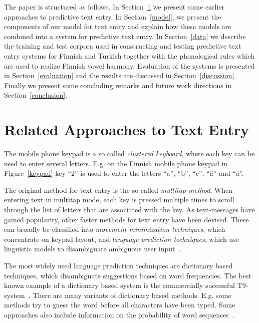 \documentclass{llncs}
\begin{document}
The paper is structured as follows. In Section~\ref{earlier-work} we
present some earlier approaches to predictive text entry. In
Section~\ref{model}, we present the components of our model for text
entry and explain how these models are combined into a system for
predictive text entry.  In Section~\ref{data} we describe the
training and test corpora used in constructing and testing predictive
text entry systems for Finnish and Turkish together with the
phonological rules which are used to realize Finnish vowel
harmony. Evaluation of the systems is presented in
Section~\ref{evaluation} and the results are discussed in
Section~\ref{discussion}. Finally we present some concluding remarks
and future work directions in Section~\ref{conclusion}.

\section{Related Approaches to Text Entry}\label{earlier-work}

The mobile phone keypad is a so called {\it clustered keyboard}, where each
key can be used to enter several letters. E.g. on the Finnish mobile
phone keypad in Figure~\ref{keypad} key ``2'' is used to enter the
letters ``a'', ``b'', ``c'', ``\"{a}'' and ``å''.

The original method for text entry is the so called
\textit{multitap-method}. When entering text in multitap mode, each key is
pressed multiple times to scroll through the list of letters that are
associated with the key. As text-messages have gained popularity, other
faster methods for text entry have been devised. These can broadly be
classified into {\it movement minimization techniques}, which concentrate on
keypad layout, and {\it language prediction techniques}, which use linguistic
models to disambiguate ambiguous user input~\cite{Mackenzie/HCI/2002}.

The most widely used language prediction techniques are dictionary
based techniques, which disambiguate suggestions based on word
frequencies. The best known example of a dictionary based system is
the commercially successful T9-system~\cite{t9-patent}. There are many
variants of dictionary based methods. E.g. some methods try to guess
the word before all characters have been typed. Some approaches also
include information on the probability of word
sequences~\cite{Mackenzie/HCI/2002}.
\end{document}
